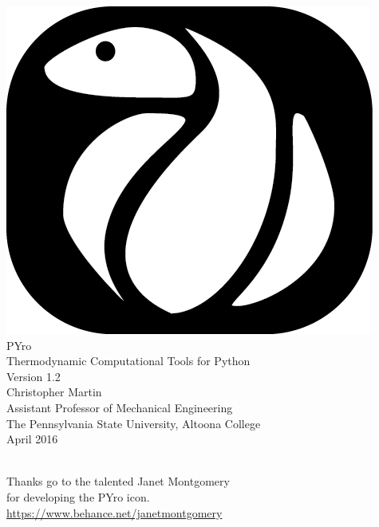 \documentclass{book}
\def\version{1.2}
\begin{document}
\frontmatter
\begin{center}
\vspace{2in}
\includegraphics{fig/PYro_Black_MedSmall}\\
\vspace{0.5in}
{\Huge PYro}\\
\vspace{0.5in}
{\huge Thermodynamic Computational Tools for Python}\\
\vspace{0.2in}
Version \version{}\\
\vspace{1in}
{\Large Christopher Martin}\\
{\large Assistant Professor of Mechanical Engineering}\\
{\large The Pennsylvania State University, Altoona College}\\
\vspace{1in}
{\large April 2016}
\end{center}
\pagebreak

\begin{center}
\mbox{}\\
\vspace{3in}
Thanks go to the talented Janet Montgomery\\
for developing the PYro icon.\\
\vspace{0.5in}
\url{https://www.behance.net/janetmontgomery}
\end{center}
\end{document}

